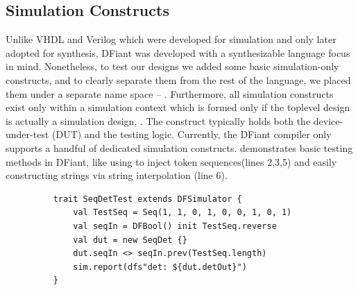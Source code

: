 
%


\subsection{Simulation Constructs}
\label{sec:simulation}
Unlike VHDL and Verilog which were developed for simulation and only later adopted for synthesis, DFiant was developed with a synthesizable language focus in mind. Nonetheless, to test our designs we added some basic simulation-only constructs, and to clearly separate them from the rest of the language, we placed them under a separate name space -- . Furthermore, all simulation constructs exist only within a simulation context which is formed only if the toplevel design is actually a simulation design, . The  construct typically holds both the device-under-test (DUT) and the testing logic. Currently, the DFiant compiler only supports a handful of dedicated simulation constructs.
 demonstrates basic testing methods in DFiant, like using  to inject token sequences(lines 2,3,5) and easily constructing strings via string interpolation (line 6).

\begin{figure}[h]
  \centering
  \captionsetup{justification=centering}    
  
  \begin{verbatim}
	trait SeqDetTest extends DFSimulator {
		val TestSeq = Seq(1, 1, 0, 1, 0, 0, 1, 0, 1)
		val seqIn = DFBool() init TestSeq.reverse
		val dut = new SeqDet {}
		dut.seqIn <> seqIn.prev(TestSeq.length)
		sim.report(dfs"det: ${dut.detOut}")
	}
  \end{verbatim}
  \label{fig:FibTest}
\end{figure}






